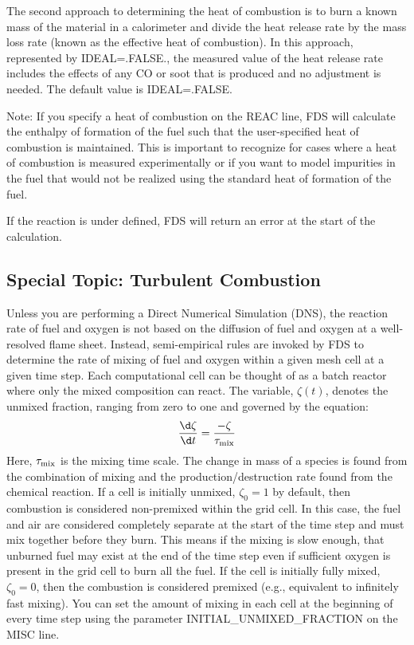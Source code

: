 \documentclass[11pt]{book}
\begin{document}
The second approach to determining the heat of combustion is to burn a known mass of the material in a calorimeter and divide the heat release
rate by the mass loss rate (known as the effective heat of combustion).  In this approach, represented by {\ct IDEAL=.FALSE.},
the measured value of the heat release rate includes the effects of any CO or soot that is produced and no adjustment is needed.  The default value is {\ct IDEAL=.FALSE.}

Note: If you specify a heat of combustion on the {\ct REAC} line, FDS will calculate the enthalpy of formation of the fuel such that the user-specified heat of combustion is maintained. This is important to recognize for cases where a heat of combustion is measured experimentally or if you want to model impurities in the fuel that would not be realized using the standard heat of formation of the fuel.

If the reaction is under defined, FDS will return an error at the start of the calculation.


\subsection{Special Topic: Turbulent Combustion}

\label{info:turbulent_combustion}

Unless you are performing a Direct Numerical Simulation (DNS), the reaction rate of fuel and oxygen is not based on the diffusion of
fuel and oxygen at a well-resolved flame sheet. Instead, semi-empirical rules are invoked by FDS to determine the rate of mixing of fuel and oxygen within
a given mesh cell at a given time step. Each computational cell can be thought of as a batch reactor where only the mixed composition can react. The variable, $\zeta(t)$, denotes the unmixed fraction, ranging from zero to one and governed by the equation:
\begin{equation}
\frac{\d \zeta}{\d t}=\frac{-\zeta}{\tau_{\rm mix}}
\label{eq:edc_mix}
\end{equation}
Here, $\tau_{\rm mix}$ is the mixing time scale. The change in mass of a species is found from the combination of mixing and the production/destruction rate found from the chemical reaction. If a cell is initially unmixed, $\zeta_0=1$ by default, then combustion is considered non-premixed within the grid cell.  In this case, the fuel and air are considered completely separate at the start of the time step and must mix together before they burn.  This means if the mixing is slow enough, that unburned fuel may exist at the end of the time step even if sufficient oxygen is present in the grid cell to burn all the fuel. If the cell is initially fully mixed, $\zeta_0=0$, then the combustion is considered premixed (e.g., equivalent to infinitely fast mixing). You can set the amount of mixing in each cell at the beginning of every time step using the parameter {\ct INITIAL\_UNMIXED\_FRACTION} on the {\ct MISC} line.
\end{document}
